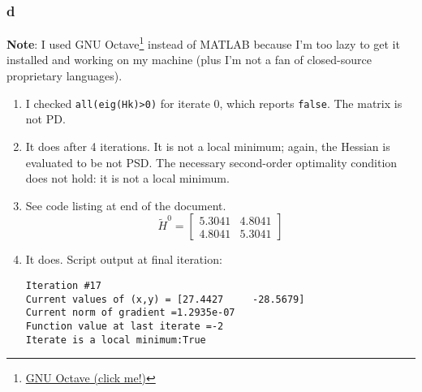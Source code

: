 \documentclass[11pt]{report}
\theoremstyle{definition}
\begin{document}
\subsubsection*{d}
\textbf{Note}: I used GNU Octave\footnote{\href{https://octave.org/}{GNU Octave (click me!)}}
instead of MATLAB because I'm too lazy to get it installed and working on my machine (plus
I'm not a fan of closed-source proprietary languages).
\begin{enumerate}
	\item I checked \lstinline{all(eig(Hk)>0)} for iterate 0, which reports
	      \lstinline{false}. The matrix is not PD.
	\item It does after 4 iterations. It is not a local minimum; again, the
	      Hessian is evaluated to be not PSD. The necessary second-order optimality
	      condition does not hold: it is not a local minimum.
	\item See code listing at end of the document.
	      \[
		      \tilde{H}^0 = \begin{bmatrix}
			      5.3041 & 4.8041 \\
			      4.8041 & 5.3041
		      \end{bmatrix}
	      \]
	\item It does. Script output at final iteration:
	      \begin{lstlisting}
Iteration #17
Current values of (x,y) = [27.4427     -28.5679]
Current norm of gradient =1.2935e-07
Function value at last iterate =-2
Iterate is a local minimum:True
\end{lstlisting}
\end{enumerate}



\end{document}
